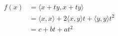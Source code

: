 \documentclass[preview]{standalone}
\begin{document}
\begin{align*}
f(x) & = \langle x + ty,x + ty \rangle \\& = \langle x,x \rangle +  2\langle x,y \rangle t + \langle y,y \rangle t^{2} \\&  = c+bt+at^{2}
\end{align*}
\end{document}

